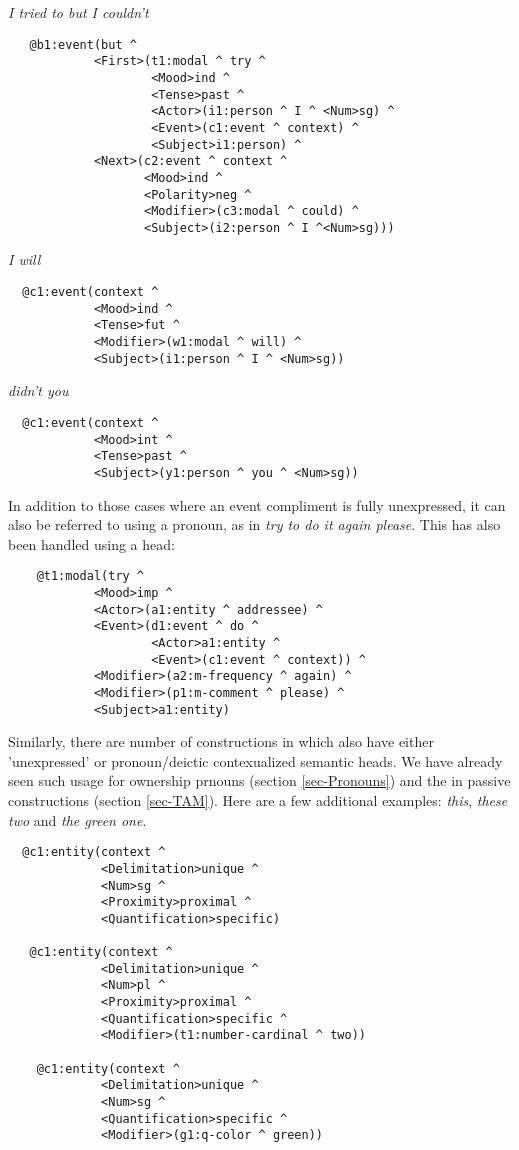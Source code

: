\emph{I tried to but I couldn't}
\begin{verbatim}
   @b1:event(but ^ 
            <First>(t1:modal ^ try ^ 
                    <Mood>ind ^ 
                    <Tense>past ^ 
                    <Actor>(i1:person ^ I ^ <Num>sg) ^ 
                    <Event>(c1:event ^ context) ^ 
                    <Subject>i1:person) ^ 
            <Next>(c2:event ^ context ^ 
                   <Mood>ind ^ 
                   <Polarity>neg ^ 
                   <Modifier>(c3:modal ^ could) ^ 
                   <Subject>(i2:person ^ I ^<Num>sg)))
\end{verbatim}
\emph{I will}
\begin{verbatim}
  @c1:event(context ^ 
            <Mood>ind ^ 
            <Tense>fut ^ 
            <Modifier>(w1:modal ^ will) ^ 
            <Subject>(i1:person ^ I ^ <Num>sg))
\end{verbatim}
\emph{didn't you}
\begin{verbatim}
  @c1:event(context ^ 
            <Mood>int ^ 
            <Tense>past ^ 
            <Subject>(y1:person ^ you ^ <Num>sg))
\end{verbatim}
In addition to those cases where an event compliment is fully unexpressed, it can also be referred to using a pronoun, as in \emph{try to do it again please}. This has also been handled using a  head: 
\begin{verbatim}
    @t1:modal(try ^ 
            <Mood>imp ^ 
            <Actor>(a1:entity ^ addressee) ^ 
            <Event>(d1:event ^ do ^ 
                    <Actor>a1:entity ^ 
                    <Event>(c1:event ^ context)) ^ 
            <Modifier>(a2:m-frequency ^ again) ^ 
            <Modifier>(p1:m-comment ^ please) ^ 
            <Subject>a1:entity)
\end{verbatim}
Similarly, there are number of constructions in which  also have either 'unexpressed' or pronoun/deictic contexualized semantic heads. We have already seen such usage for ownership prnouns (section \ref{sec-Pronouns}) and the   in passive constructions (section \ref{sec-TAM}). Here are a few additional examples: \emph{this}, \emph{these two} and \emph{the green one}.
\begin{verbatim}
  @c1:entity(context ^   
             <Delimitation>unique ^ 
             <Num>sg ^ 
             <Proximity>proximal ^ 
             <Quantification>specific)
             
   @c1:entity(context ^ 
             <Delimitation>unique ^ 
             <Num>pl ^ 
             <Proximity>proximal ^ 
             <Quantification>specific ^ 
             <Modifier>(t1:number-cardinal ^ two))
             
    @c1:entity(context ^ 
             <Delimitation>unique ^ 
             <Num>sg ^ 
             <Quantification>specific ^ 
             <Modifier>(g1:q-color ^ green))  
 \end{verbatim}       

